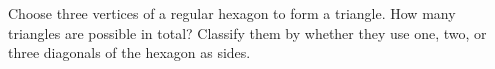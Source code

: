 Choose three vertices of a regular hexagon to form a triangle. How many triangles are possible in total? Classify them by whether they use one, two, or three diagonals of the hexagon as sides.
